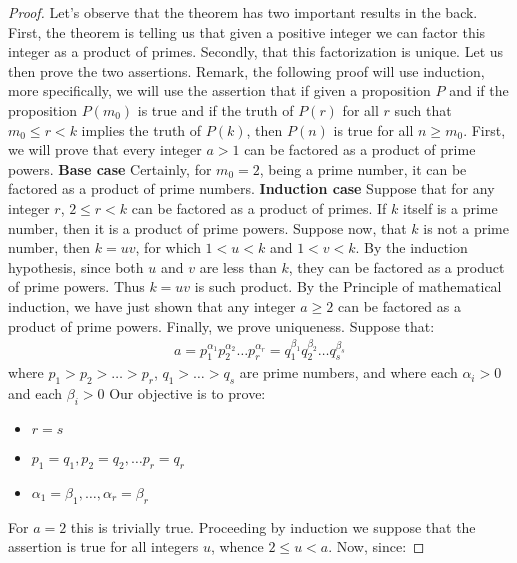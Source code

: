 \documentclass[11pt,a4paper]{article}
\begin{document}
\begin{proof}
	Let's observe that the theorem has two important results in the back. First, the theorem is telling us that given a positive integer we can factor this integer as a product of primes. Secondly, that this factorization is unique. Let us then prove the two assertions. \newline
	Remark, the following proof will use induction, more specifically, we will use the assertion that if given a proposition $P$ and if the proposition $P(m_0)$ is true and if the truth of $P(r)$ for all $r$ such that $ m_0 \leq r < k$ implies the truth of $P(k)$, then $P(n)$ is true for all $ n \geq m_0$. \newline
	First, we will prove that every integer $ a > 1$ can be factored as a product of prime powers. \newline
	\textbf{Base case} Certainly, for $m_0 = 2 $, being a prime number, it can be factored as a product of prime numbers. \newline
	\textbf{Induction case} Suppose that for any integer $r$, $ 2 \leq r < k$ can be factored as a product of primes. If $k$ itself is a prime number, then it is a product of prime powers. Suppose now, that $k$ is not a prime number, then $k = uv$, for which $ 1 < u < k$  and $ 1 < v < k$. By the induction hypothesis, since both $u$ and $v$ are less than $k$, they can be factored as a product of prime powers. Thus $ k = uv$ is such product. By the Principle of mathematical induction, we have just shown that any integer $a \geq 2$ can be factored as a product of prime powers. \newline
	Finally, we prove uniqueness. Suppose that:
	\begin{align*}
	a = p_1^{\alpha_1} p_2^{\alpha_2} \ldots p_r^{\alpha_r} = q_1^{\beta_1} q_2^{\beta_2} \ldots q_s^{\beta_s} 
	\end{align*} 
	where $p_1 > p_2 > \ldots > p_r$, $q_1> \ldots > q_s$ are prime numbers, and where each $ \alpha_i > 0 $ and each $ \beta_i > 0 $ Our objective is to prove:
	\begin{itemize}
		\item $r =s$
		\item $ p_1 = q_1, p_2 = q_2, \ldots p_r = q_r $
		\item $ \alpha _1 = \beta_1, \ldots, \alpha_r = \beta_r$
	\end{itemize}
	For $a = 2$ this is trivially true. Proceeding by induction we suppose that the assertion is true for all integers $u$, whence $ 2 \leq u < a$. Now, since:

\end{proof}
\end{document}
